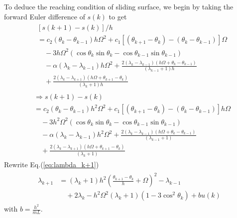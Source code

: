 \documentclass[10pt,final,journal]{IEEEtran}
\begin{document}
	To deduce the reaching condition of sliding surface, we begin by taking the forward Euler difference of $s(k)$ to get
	\begin{align*}\begin{split}
                &[s(k+1)-s(k)]/h\\
                &=c_2(\theta_k-\theta_{k-1})h\Omega^2+c_1[(\theta_{k+1}-\theta_k)-(\theta_{k}-\theta_{k-1})]\Omega\\
                &\quad-3h\Omega^2(\cos\theta_k\sin\theta_k-\cos\theta_{k-1}\sin\theta_{k-1})\\
				&\quad-\alpha(\lambda_k-\lambda_{k-1})h\Omega^2+\frac{2(\lambda_k-\lambda_{k-1})(h\Omega+\theta_k-\theta_{k-1})}{(\lambda_{k-1}+1)h}\\
				&\quad+\frac{2(\lambda_k-\lambda_{k+1})(h\Omega+\theta_{k+1}-\theta_{k})}{(\lambda_{k}+1)h}
        \end{split}\end{align*}
        \begin{align*}\begin{split}
                &\Rightarrow s(k+1)-s(k)\\
                &=c_2(\theta_k-\theta_{k-1})h^2\Omega^2+c_1[(\theta_{k+1}-\theta_k)-(\theta_{k}-\theta_{k-1})]h\Omega\\
				&\quad-3h^2\Omega^2(\cos\theta_k\sin\theta_k-\cos\theta_{k-1}\sin\theta_{k-1})\\
				&\quad-\alpha(\lambda_k-\lambda_{k-1})h^2\Omega^2+\frac{2(\lambda_k-\lambda_{k-1})(h\Omega+\theta_k-\theta_{k-1})}{(\lambda_{k-1}+1)}\\
                &\quad+\frac{2(\lambda_k-\lambda_{k+1})(h\Omega+\theta_{k+1}-\theta_{k})}{(\lambda_{k}+1)}
	\end{split}\end{align*} 
	Rewrite Eq.(\ref{eq:lambda_k+1})
	\begin{align}\begin{split}
                \lambda_{k+1}&=(\lambda_k+1)h^2\left(\frac{\theta_{k+1}-\theta_{k}}{h}+\Omega\right)^2
                -\lambda_{k-1}\\
                &\quad+2\lambda_k-h^2\Omega^2(\lambda_k+1)(1-3\cos^2\theta_{k})+bu(k)
	\end{split}\end{align}
	with $b = \frac{h^2}{\bar{m}L}$.
	
\end{document}
